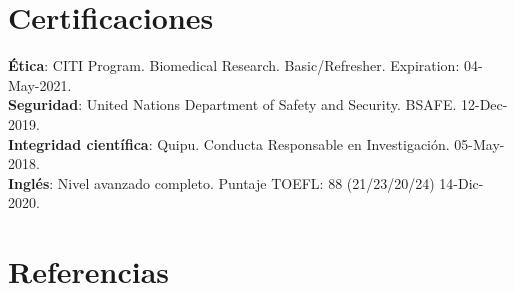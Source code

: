 \documentclass[margin,line]{res}
\begin{document}
\begin{resume}
		
		
		\section{\sc Certificaciones}
		{\bf Ética}: CITI Program. Biomedical Research. Basic/Refresher. Expiration: 04-May-2021.\\
		{\bf Seguridad}: United Nations Department of Safety and Security. BSAFE. 12-Dec-2019.\\
		{\bf Integridad científica}: Quipu. Conducta Responsable en Investigación. 05-May-2018.\\
		{\bf Inglés}: Nivel avanzado completo. Puntaje TOEFL: 88 (21/23/20/24) 14-Dic-2020.
		
		\section{\sc Referencias}
		

\end{resume}
\end{document}
